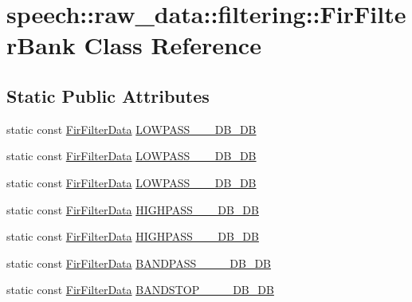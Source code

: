 \hypertarget{classspeech_1_1raw__data_1_1filtering_1_1FirFilterBank}{\section{speech\+:\+:raw\+\_\+data\+:\+:filtering\+:\+:Fir\+Filter\+Bank Class Reference}
\label{classspeech_1_1raw__data_1_1filtering_1_1FirFilterBank}
}
\subsection*{Static Public Attributes}
\begin{DoxyCompactItemize}
\item 
static const \hyperlink{structspeech_1_1raw__data_1_1filtering_1_1FirFilterData}{Fir\+Filter\+Data} \hyperlink{classspeech_1_1raw__data_1_1filtering_1_1FirFilterBank_aa67005c1ebcf970f2826a2d9ee426f1d}{L\+O\+W\+P\+A\+S\+S\+\_\+\_\+\_\+D\+B\+\_\+D\+B}
\item 
static const \hyperlink{structspeech_1_1raw__data_1_1filtering_1_1FirFilterData}{Fir\+Filter\+Data} \hyperlink{classspeech_1_1raw__data_1_1filtering_1_1FirFilterBank_a4bd8bcb62eeeb42a4c0fbcf745211af5}{L\+O\+W\+P\+A\+S\+S\+\_\+\_\+\_\+D\+B\+\_\+D\+B}
\item 
static const \hyperlink{structspeech_1_1raw__data_1_1filtering_1_1FirFilterData}{Fir\+Filter\+Data} \hyperlink{classspeech_1_1raw__data_1_1filtering_1_1FirFilterBank_a83f13453e59bd6a8d00ba0a8ce9e67f6}{L\+O\+W\+P\+A\+S\+S\+\_\+\_\+\_\+D\+B\+\_\+D\+B}
\item 
static const \hyperlink{structspeech_1_1raw__data_1_1filtering_1_1FirFilterData}{Fir\+Filter\+Data} \hyperlink{classspeech_1_1raw__data_1_1filtering_1_1FirFilterBank_a3fe4a0224ec1af6c10d6cb760dd1d336}{H\+I\+G\+H\+P\+A\+S\+S\+\_\+\_\+\_\+D\+B\+\_\+D\+B}
\item 
static const \hyperlink{structspeech_1_1raw__data_1_1filtering_1_1FirFilterData}{Fir\+Filter\+Data} \hyperlink{classspeech_1_1raw__data_1_1filtering_1_1FirFilterBank_ab62552f4111d615c675582de6378e462}{H\+I\+G\+H\+P\+A\+S\+S\+\_\+\_\+\_\+D\+B\+\_\+D\+B}
\item 
static const \hyperlink{structspeech_1_1raw__data_1_1filtering_1_1FirFilterData}{Fir\+Filter\+Data} \hyperlink{classspeech_1_1raw__data_1_1filtering_1_1FirFilterBank_a28029922c12b58351adda2556609499d}{B\+A\+N\+D\+P\+A\+S\+S\+\_\+\_\+\_\+\_\+D\+B\+\_\+D\+B}
\item 
static const \hyperlink{structspeech_1_1raw__data_1_1filtering_1_1FirFilterData}{Fir\+Filter\+Data} \hyperlink{classspeech_1_1raw__data_1_1filtering_1_1FirFilterBank_aaecaed690bc2ca0ec02ae8dd29491d15}{B\+A\+N\+D\+S\+T\+O\+P\+\_\+\_\+\_\+\_\+D\+B\+\_\+D\+B}
\end{DoxyCompactItemize}


